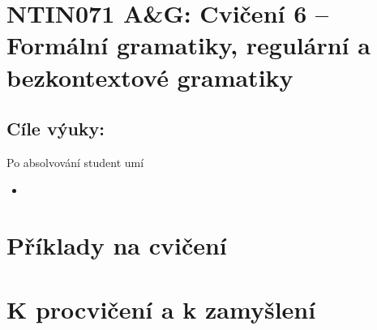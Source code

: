 \documentclass[a4paper,12pt]{amsart}
\begin{document}
\thispagestyle{empty}

\section*{NTIN071 A\&G: Cvičení 6 -- Formální gramatiky, regulární a bezkontextové gramatiky}

\medskip

\subsection*{Cíle výuky:} Po absolvování student umí

\begin{itemize}\setlength{\itemsep}{0pt}
    \item 
\end{itemize}

\section*{Příklady na cvičení}

\medskip\begin{problem} 

\end{problem}


\section*{K procvičení a k zamyšlení}


\medskip\begin{problem}

\end{problem}
\end{document}

